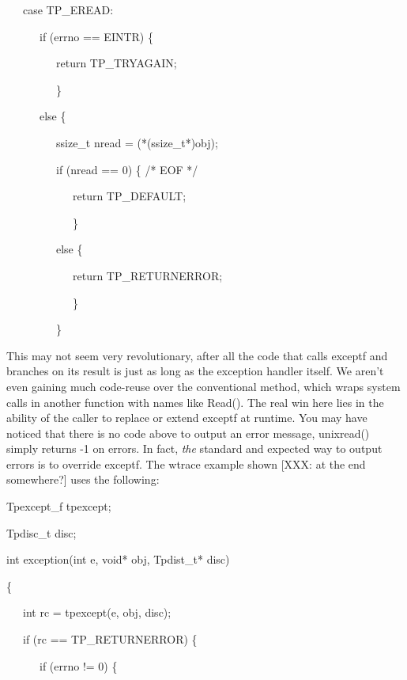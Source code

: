 {\ttfamily\mdseries
\ \ \ case TP\_EREAD:}

{\ttfamily\mdseries
\ \ \ \ \ \ if (errno == EINTR) \{}

{\ttfamily\mdseries
\ \ \ \ \ \ \ \ \ return TP\_TRYAGAIN;}

{\ttfamily\mdseries
\ \ \ \ \ \ \ \ \ \}}

{\ttfamily\mdseries
\ \ \ \ \ \ else \{}

{\ttfamily\mdseries
\ \ \ \ \ \ \ \ \ ssize\_t nread = (*(ssize\_t*)obj);}

{\ttfamily\mdseries
\ \ \ \ \ \ \ \ \ if (nread == 0) \{ /* EOF */}

{\ttfamily\mdseries
\ \ \ \ \ \ \ \ \ \ \ \ return TP\_DEFAULT;}

{\ttfamily\mdseries
\ \ \ \ \ \ \ \ \ \ \ \ \}}

{\ttfamily\mdseries
\ \ \ \ \ \ \ \ \ else \{}

{\ttfamily\mdseries
\ \ \ \ \ \ \ \ \ \ \ \ return TP\_RETURNERROR;}

{\ttfamily\mdseries
\ \ \ \ \ \ \ \ \ \ \ \ \}}

{\ttfamily\mdseries
\ \ \ \ \ \ \ \ \ \}}


This may not seem very revolutionary, after all the code that calls
exceptf and branches on its result is just as long as the exception
handler itself. We aren't even gaining much code-reuse over the
conventional method, which wraps system calls in another function with
names like Read(). The real win here lies in the ability of the
caller to replace or extend exceptf at runtime. You may have noticed
that there is no code above to output an error message, unixread()
simply returns -1 on errors. In fact, \textit{the} standard and
expected way to output errors is to override exceptf. The wtrace
example shown [XXX: at the end somewhere?] uses the following:

{\ttfamily\mdseries
Tpexcept\_f tpexcept;}

{\ttfamily\mdseries
Tpdisc\_t disc;}


\bigskip

{\ttfamily\mdseries
int exception(int e, void* obj, Tpdist\_t* disc)}

{\ttfamily\mdseries
\{}

{\ttfamily\mdseries
\ \ \ int rc = tpexcept(e, obj, disc);}

{\ttfamily\mdseries
\ \ \ if (rc == TP\_RETURNERROR) \{}

{\ttfamily\mdseries
\ \ \ \ \ \ if (errno != 0) \{}

